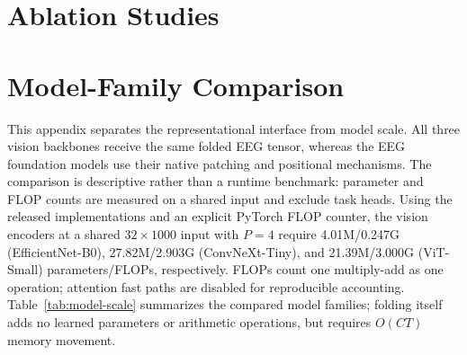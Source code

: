 \clearpage
\section{Ablation Studies}
\label{app:ablations}


\section{Model-Family Comparison}
\label{app:model-families}

This appendix separates the representational interface from model scale. All
three vision backbones receive the same folded EEG tensor, whereas the EEG
foundation models use their native patching and positional mechanisms. The
comparison is descriptive rather than a runtime benchmark: parameter and FLOP
counts are measured on a shared input and exclude task heads. Using the
released implementations and an explicit PyTorch FLOP counter, the vision
encoders at a shared $32\times1000$ input with $P=4$ require 4.01M/0.247G
(EfficientNet-B0), 27.82M/2.903G (ConvNeXt-Tiny), and 21.39M/3.000G
(ViT-Small) parameters/FLOPs, respectively. FLOPs count one multiply-add as
one operation; attention fast paths are disabled for reproducible accounting.
Table~\ref{tab:model-scale} summarizes the compared model families; folding
itself adds no learned parameters or arithmetic operations, but requires
$O(CT)$ memory movement.

